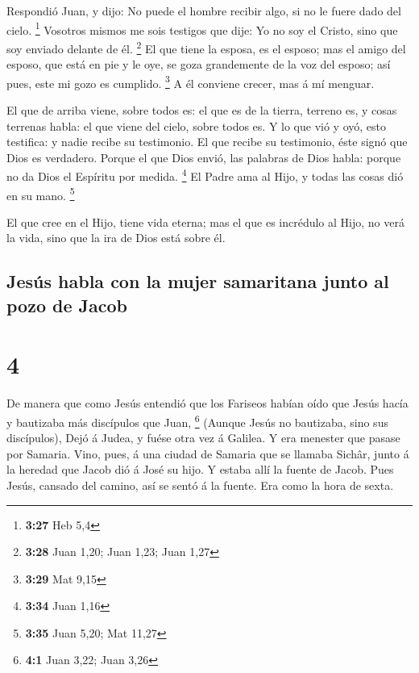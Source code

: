  Respondió Juan, y dijo: No puede el hombre recibir algo,
si no le fuere dado del cielo. \footnote{\textbf{3:27} Heb 5,4}
 Vosotros mismos me sois testigos que dije: Yo no soy el
Cristo, sino que soy enviado delante de él. \footnote{\textbf{3:28} Juan
  1,20; Juan 1,23; Juan 1,27}  El que tiene la esposa, es
el esposo; mas el amigo del esposo, que está en pie y le oye, se goza
grandemente de la voz del esposo; así pues, este mi gozo es cumplido.
\footnote{\textbf{3:29} Mat 9,15}  A él conviene crecer,
mas á mí menguar.

 El que de arriba viene, sobre todos es: el que es de la
tierra, terreno es, y cosas terrenas habla: el que viene del cielo,
sobre todos es.  Y lo que vió y oyó, esto testifica: y
nadie recibe su testimonio.  El que recibe su testimonio,
éste signó que Dios es verdadero.  Porque el que Dios
envió, las palabras de Dios habla: porque no da Dios el Espíritu por
medida. \footnote{\textbf{3:34} Juan 1,16}  El Padre ama al
Hijo, y todas las cosas dió en su mano. \footnote{\textbf{3:35} Juan
  5,20; Mat 11,27}

 El que cree en el Hijo, tiene vida eterna; mas el que es
incrédulo al Hijo, no verá la vida, sino que la ira de Dios está sobre
él.

\hypertarget{jesuxfas-habla-con-la-mujer-samaritana-junto-al-pozo-de-jacob}{%
\subsection{Jesús habla con la mujer samaritana junto al pozo de
Jacob}\label{jesuxfas-habla-con-la-mujer-samaritana-junto-al-pozo-de-jacob}}

\hypertarget{section-3}{%
\section{4}\label{section-3}}

 De manera que como Jesús entendió que los Fariseos habían
oído que Jesús hacía y bautizaba más discípulos que Juan, \footnote{\textbf{4:1}
  Juan 3,22; Juan 3,26}  (Aunque Jesús no bautizaba, sino
sus discípulos),  Dejó á Judea, y fuése otra vez á Galilea.
 Y era menester que pasase por Samaria.  Vino,
pues, á una ciudad de Samaria que se llamaba Sichâr, junto á la heredad
que Jacob dió á José su hijo.  Y estaba allí la fuente de
Jacob. Pues Jesús, cansado del camino, así se sentó á la fuente. Era
como la hora de sexta.

